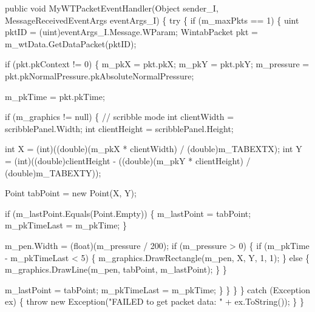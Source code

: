 \begin{DoxyCode}
\textcolor{keyword}{public} \textcolor{keywordtype}{void} MyWTPacketEventHandler(Object sender\_I, MessageReceivedEventArgs eventArgs\_I)
\{
    \textcolor{keywordflow}{try}
    \{
        \textcolor{keywordflow}{if} (m\_maxPkts == 1)
        \{
            uint pktID = (uint)eventArgs\_I.Message.WParam;
            WintabPacket pkt = m\_wtData.GetDataPacket(pktID);

            \textcolor{keywordflow}{if} (pkt.pkContext != 0)
            \{
                m\_pkX = pkt.pkX;
                m\_pkY = pkt.pkY;
                m\_pressure = pkt.pkNormalPressure.pkAbsoluteNormalPressure;

                m\_pkTime = pkt.pkTime;

                \textcolor{keywordflow}{if} (m\_graphics != null)
                \{
                    \textcolor{comment}{// scribble mode}
                    \textcolor{keywordtype}{int} clientWidth = scribblePanel.Width;
                    \textcolor{keywordtype}{int} clientHeight = scribblePanel.Height;

                    \textcolor{keywordtype}{int} X = (int)((\textcolor{keywordtype}{double})(m\_pkX * clientWidth) / (\textcolor{keywordtype}{double})m\_TABEXTX);
                    \textcolor{keywordtype}{int} Y = (int)((\textcolor{keywordtype}{double})clientHeight - 
                        ((double)(m\_pkY * clientHeight) / (double)m\_TABEXTY));

                    Point tabPoint = \textcolor{keyword}{new} Point(X, Y);

                    \textcolor{keywordflow}{if} (m\_lastPoint.Equals(Point.Empty))
                    \{
                        m\_lastPoint = tabPoint;
                        m\_pkTimeLast = m\_pkTime;
                    \}

                    m\_pen.Width = (float)(m\_pressure / 200);
                    \textcolor{keywordflow}{if} (m\_pressure > 0)
                    \{
                        \textcolor{keywordflow}{if} (m\_pkTime - m\_pkTimeLast < 5)
                        \{
                            m\_graphics.DrawRectangle(m\_pen, X, Y, 1, 1);
                        \}
                        \textcolor{keywordflow}{else}
                        \{
                            m\_graphics.DrawLine(m\_pen, tabPoint, m\_lastPoint);
                        \}
                    \}

                    m\_lastPoint = tabPoint;
                    m\_pkTimeLast = m\_pkTime;
                \}
            \}
        \}
    \}
    \textcolor{keywordflow}{catch} (Exception ex)
    \{
        \textcolor{keywordflow}{throw} \textcolor{keyword}{new} Exception(\textcolor{stringliteral}{"FAILED to get packet data: "} + ex.ToString());
    \}
\}
\end{DoxyCode}
